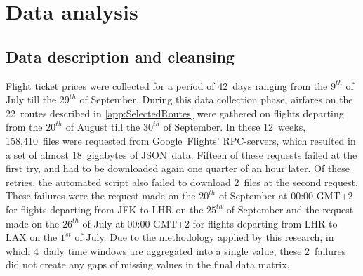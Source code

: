 \chapter{Data analysis}
\label{chap:DataAnalysis}
\section{Data description and cleansing}
Flight ticket prices were collected for a period of 42~days ranging from the $9^{th}$ of July till the $29^{th}$ of September. During this data collection phase, airfares on the 22~routes described in \autoref{app:SelectedRoutes} were gathered on flights departing from the $20^{th}$ of August till the $30^{th}$ of September. In these 12~weeks, 158,410~files were requested from Google~Flights' RPC-servers, which resulted in a set of almost 18~gigabytes of JSON~data. Fifteen of these requests failed at the first try, and had to be downloaded again one quarter of an hour later. Of these retries, the automated script also failed to download 2~files at the second request. These failures were the request made on the $20^{th}$ of September at 00:00 GMT+2 for flights departing from JFK to LHR on the $25^{th}$ of September and the request made on the $26^{th}$ of July at 00:00 GMT+2 for flights departing from LHR to LAX on the $1^{st}$ of July. Due to the methodology applied by this research, in which 4~daily time windows are aggregated into a single value, these 2~failures did not create any gaps of missing values in the final data matrix.

